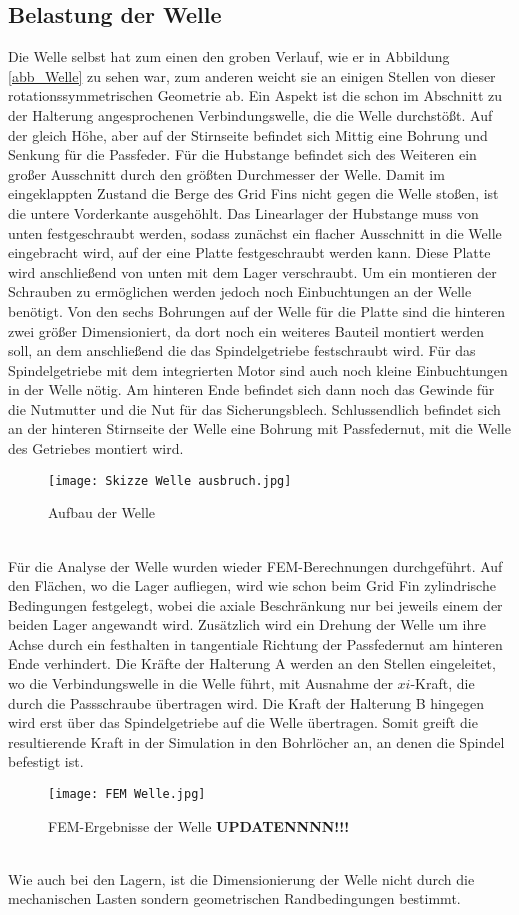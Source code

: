 \subsection{Belastung der Welle}
Die Welle selbst hat zum einen den groben Verlauf, wie er in Abbildung \ref{abb_Welle} zu sehen war, zum anderen weicht sie an einigen Stellen von dieser rotationssymmetrischen Geometrie ab. Ein Aspekt ist die schon im Abschnitt zu der Halterung angesprochenen Verbindungswelle, die die Welle durchstößt. Auf der gleich Höhe, aber auf der Stirnseite befindet sich Mittig eine Bohrung und Senkung für die Passfeder. Für die Hubstange befindet sich des Weiteren ein großer Ausschnitt durch den größten Durchmesser der Welle. Damit im eingeklappten Zustand die Berge des Grid Fins nicht gegen die Welle stoßen, ist die untere Vorderkante ausgehöhlt. Das Linearlager der Hubstange muss von unten festgeschraubt werden, sodass zunächst ein flacher Ausschnitt in die Welle eingebracht wird, auf der eine Platte festgeschraubt werden kann. Diese Platte wird anschließend von unten mit dem Lager verschraubt. Um ein montieren der Schrauben zu ermöglichen werden jedoch noch Einbuchtungen an der Welle benötigt. Von den sechs Bohrungen auf der Welle für die Platte sind die hinteren zwei größer Dimensioniert, da dort noch ein weiteres Bauteil montiert werden soll, an dem anschließend die das Spindelgetriebe festschraubt wird.
Für das Spindelgetriebe mit dem integrierten Motor sind auch noch kleine Einbuchtungen in der Welle nötig. Am hinteren Ende befindet sich dann noch das Gewinde für die Nutmutter und die Nut für das Sicherungsblech. Schlussendlich befindet sich an der hinteren Stirnseite der Welle eine Bohrung mit Passfedernut, mit die Welle des Getriebes montiert wird.
\begin{figure}[h] 
	\centering
	\texttt{[image: Skizze Welle ausbruch.jpg]}
	\caption{Aufbau der Welle}
\end{figure}\\
Für die Analyse der Welle wurden wieder FEM-Berechnungen durchgeführt. Auf den Flächen, wo die Lager aufliegen, wird wie schon beim Grid Fin zylindrische Bedingungen festgelegt, wobei die axiale Beschränkung nur bei jeweils einem der beiden Lager angewandt wird. Zusätzlich wird ein Drehung der Welle um ihre Achse durch ein festhalten in tangentiale Richtung der Passfedernut am hinteren Ende verhindert.
Die Kräfte der Halterung A werden an den Stellen eingeleitet, wo die Verbindungswelle in die Welle führt, mit Ausnahme der $xi$-Kraft, die durch die Passschraube übertragen wird. 
Die Kraft der Halterung B hingegen wird erst über das Spindelgetriebe auf die Welle übertragen. Somit greift die resultierende Kraft in der Simulation in den Bohrlöcher an, an denen die Spindel befestigt ist.
\begin{figure}[h] 
	\centering
	\texttt{[image: FEM Welle.jpg]}
	\caption{FEM-Ergebnisse der Welle \textbf{UPDATENNNN!!!}}
	\label{abb_Well_FEM}
\end{figure}\\
Wie auch bei den Lagern, ist die Dimensionierung der Welle nicht durch die mechanischen Lasten sondern geometrischen Randbedingungen bestimmt.


